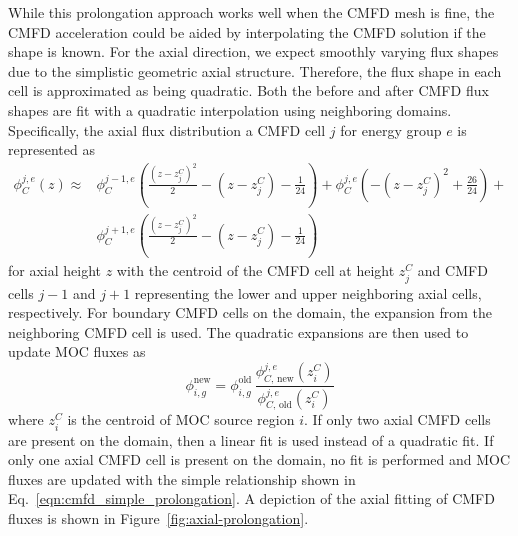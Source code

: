 While this prolongation approach works well when the \ac{CMFD} mesh is fine, the \ac{CMFD} acceleration could be aided by interpolating the \ac{CMFD} solution if the shape is known. For the axial direction, we expect smoothly varying flux shapes due to the simplistic geometric axial structure. Therefore, the flux shape in each cell is approximated as being quadratic. Both the before and after \ac{CMFD} flux shapes are fit with a quadratic interpolation using neighboring domains. Specifically, the axial flux distribution a \ac{CMFD} cell $j$ for energy group $e$ is represented as
\begin{equation}
\begin{split}
\phi_C^{j,e}(z) \approx & \phi_C^{j-1,e}\left(\frac{\left(z-z^C_j \right)^2}{2} - \left(z-z^C_j \right) - \frac{1}{24} \right) + \phi_C^{j,e}\left(-\left(z-z^C_j \right)^2 + \frac{26}{24} \right) + \\ & \phi_C^{j+1,e}\left(\frac{\left(z-z^C_j \right)^2}{2} - \left(z-z^C_j \right) - \frac{1}{24} \right)
\end{split}
\end{equation}
for axial height $z$ with the centroid of the \ac{CMFD} cell at height $z^C_{j}$ and \ac{CMFD} cells $j-1$ and $j+1$ representing the lower and upper neighboring axial cells, respectively. For boundary \ac{CMFD} cells on the domain, the expansion from the neighboring \ac{CMFD} cell is used. The quadratic expansions are then used to update \ac{MOC} fluxes as
\begin{equation}
\phi_{i,g}^{\text{new}} = \phi_{i,g}^{\text{old}} \, \frac{\phi_{C, \, \text{new}}^{j,e}(z^C_i)}{\phi_{C, \, \text{old}}^{j,e}(z^C_i)}
\label{eq:axial-prolongation}
\end{equation} 
where $z^C_i$ is the centroid of \ac{MOC} source region $i$. If only two axial \ac{CMFD} cells are present on the domain, then a linear fit is used instead of a quadratic fit. If only one axial \ac{CMFD} cell is present on the domain, no fit is performed and \ac{MOC} fluxes are updated with the simple relationship shown in Eq.~\ref{eqn:cmfd_simple_prolongation}. A depiction of the axial fitting of \ac{CMFD} fluxes is shown in Figure~\ref{fig:axial-prolongation}.

